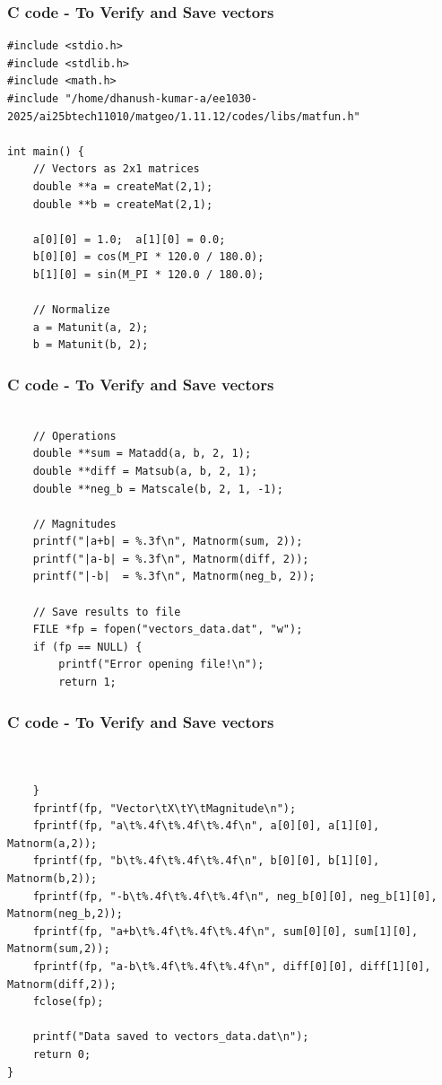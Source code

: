 \documentclass{beamer}
\begin{document}
\begin{frame}[fragile]                            
\frametitle{C code - To Verify and Save vectors}                
\begin{lstlisting}
#include <stdio.h>
#include <stdlib.h>
#include <math.h>
#include "/home/dhanush-kumar-a/ee1030-2025/ai25btech11010/matgeo/1.11.12/codes/libs/matfun.h"

int main() {
    // Vectors as 2x1 matrices
    double **a = createMat(2,1);
    double **b = createMat(2,1);

    a[0][0] = 1.0;  a[1][0] = 0.0;  
    b[0][0] = cos(M_PI * 120.0 / 180.0);  
    b[1][0] = sin(M_PI * 120.0 / 180.0);

    // Normalize
    a = Matunit(a, 2);
    b = Matunit(b, 2);
\end{lstlisting}


\end{frame}


\begin{frame}[fragile]                            
\frametitle{C code - To Verify and Save vectors}                
\begin{lstlisting}

    // Operations
    double **sum = Matadd(a, b, 2, 1);
    double **diff = Matsub(a, b, 2, 1);
    double **neg_b = Matscale(b, 2, 1, -1);

    // Magnitudes
    printf("|a+b| = %.3f\n", Matnorm(sum, 2));
    printf("|a-b| = %.3f\n", Matnorm(diff, 2));
    printf("|-b|  = %.3f\n", Matnorm(neg_b, 2));

    // Save results to file
    FILE *fp = fopen("vectors_data.dat", "w");
    if (fp == NULL) {
        printf("Error opening file!\n");
        return 1;
\end{lstlisting}


\end{frame}


\begin{frame}[fragile]                            
\frametitle{C code - To Verify and Save vectors}                
\begin{lstlisting}


    }
    fprintf(fp, "Vector\tX\tY\tMagnitude\n");
    fprintf(fp, "a\t%.4f\t%.4f\t%.4f\n", a[0][0], a[1][0], Matnorm(a,2));
    fprintf(fp, "b\t%.4f\t%.4f\t%.4f\n", b[0][0], b[1][0], Matnorm(b,2));
    fprintf(fp, "-b\t%.4f\t%.4f\t%.4f\n", neg_b[0][0], neg_b[1][0], Matnorm(neg_b,2));
    fprintf(fp, "a+b\t%.4f\t%.4f\t%.4f\n", sum[0][0], sum[1][0], Matnorm(sum,2));
    fprintf(fp, "a-b\t%.4f\t%.4f\t%.4f\n", diff[0][0], diff[1][0], Matnorm(diff,2));
    fclose(fp);

    printf("Data saved to vectors_data.dat\n");
    return 0;
}

\end{lstlisting}
\end{frame}
\end{document}
